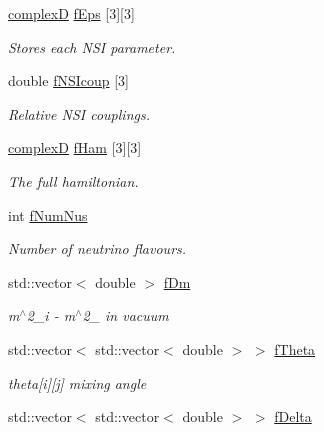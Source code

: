 \begin{DoxyCompactItemize}
\item 
\hyperlink{EigenPoint_8h_a67ca8e107e20610c3fff78d5e726ece0}{complexD} \hyperlink{classOscProb_1_1PMNS__NSI_ab9328cb72e868b395f3efdd75b6af5e4}{f\+Eps} \mbox{[}3\mbox{]}\mbox{[}3\mbox{]}
\begin{DoxyCompactList}\small\item\em Stores each N\+SI parameter. \end{DoxyCompactList}\item 
double \hyperlink{classOscProb_1_1PMNS__NSI_a1ac51957bbc4cec9fcfd8f816491cc95}{f\+N\+S\+Icoup} \mbox{[}3\mbox{]}
\begin{DoxyCompactList}\small\item\em Relative N\+SI couplings. \end{DoxyCompactList}\item 
\hyperlink{EigenPoint_8h_a67ca8e107e20610c3fff78d5e726ece0}{complexD} \hyperlink{classOscProb_1_1PMNS__Fast_a94286a881bc53dd512a89d548346b611}{f\+Ham} \mbox{[}3\mbox{]}\mbox{[}3\mbox{]}
\begin{DoxyCompactList}\small\item\em The full hamiltonian. \end{DoxyCompactList}\item 
int \hyperlink{classOscProb_1_1PMNS__Base_a24bb74bed63569dfe88b18fa6a08060e}{f\+Num\+Nus}
\begin{DoxyCompactList}\small\item\em Number of neutrino flavours. \end{DoxyCompactList}\item 
std\+::vector$<$ double $>$ \hyperlink{classOscProb_1_1PMNS__Base_a406a31c3b5d620e5a0cace5b411f9f70}{f\+Dm}
\begin{DoxyCompactList}\small\item\em m$^\wedge$2\+\_\+i -\/ m$^\wedge$2\+\_ in vacuum \end{DoxyCompactList}\item 
std\+::vector$<$ std\+::vector$<$ double $>$ $>$ \hyperlink{classOscProb_1_1PMNS__Base_a1976887cd658dd86b2336c181f1470b4}{f\+Theta}
\begin{DoxyCompactList}\small\item\em theta\mbox{[}i\mbox{]}\mbox{[}j\mbox{]} mixing angle \end{DoxyCompactList}\item 
std\+::vector$<$ std\+::vector$<$ double $>$ $>$ \hyperlink{classOscProb_1_1PMNS__Base_ab2a5fa40e689b221c8a7d2c17213810d}{f\+Delta}

\end{DoxyCompactItemize}
